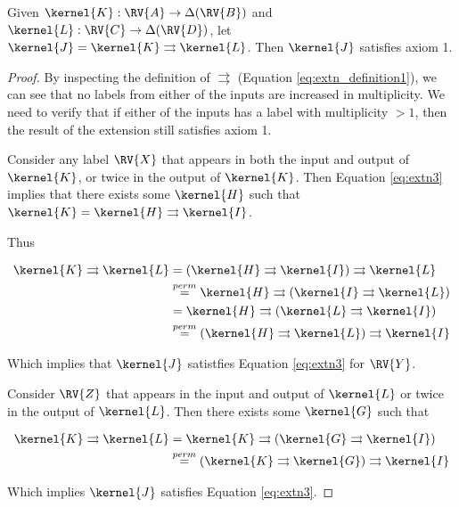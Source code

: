 \begin{theorem}
Given $\kernel{K}:\RV{A}\to\Delta(\RV{B})$ and $\kernel{L}:\RV{C}\to\Delta(\RV{D})$, let $\kernel{J}=\kernel{K}\rightrightarrows \kernel{L}$. Then $\kernel{J}$ satisfies axiom 1.
\end{theorem}

\begin{proof}
By inspecting the definition of $\rightrightarrows$ (Equation \ref{eq:extn_definition1}), we can see that no labels from either of the inputs are increased in multiplicity. We need to verify that if either of the inputs has a label with multiplicity $>1$, then the result of the extension still satisfies axiom 1. 

Consider any label $\RV{X}$ that appears in both the input and output of $\kernel{K}$, or twice in the output of $\kernel{K}$. Then Equation \ref{eq:extn3} implies that there exists some $\kernel{H}$ such that $\kernel{K}=\kernel{H}\rightrightarrows\kernel{I}$.

Thus

\begin{align}
    \kernel{K}\rightrightarrows \kernel{L} &= (\kernel{H}\rightrightarrows \kernel{I})\rightrightarrows\kernel{L}\\
                                           &\overset{perm}{=} \kernel{H}\rightrightarrows(\kernel{I}\rightrightarrows\kernel{L})\\
                                           &= \kernel{H}\rightrightarrows(\kernel{L}\rightrightarrows\kernel{I})\\
                                           &\overset{perm}{=} (\kernel{H}\rightrightarrows\kernel{L})\rightrightarrows\kernel{I}
\end{align}

Which implies that $\kernel{J}$ satistfies Equation \ref{eq:extn3} for $\RV{Y}$.

Consider $\RV{Z}$ that appears in the input and output of $\kernel{L}$ or twice in the output of $\kernel{L}$. Then there exists some $\kernel{G}$ such that

\begin{align}
    \kernel{K}\rightrightarrows \kernel{L} &= \kernel{K}\rightrightarrows (\kernel{G}\rightrightarrows\kernel{I})\\
                                           &\overset{perm}{=} (\kernel{K}\rightrightarrows \kernel{G})\rightrightarrows\kernel{I}
\end{align}

Which implies $\kernel{J}$ satisfies Equation \ref{eq:extn3}.
\end{proof}
